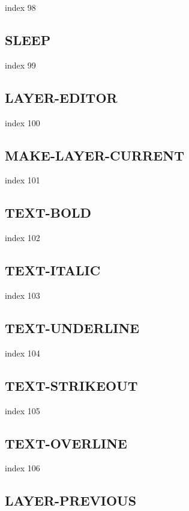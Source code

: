 \documentclass[a4paper]{report}
\begin{document}
 index 98

\subsection{SLEEP}

index 99

\subsection{LAYER-EDITOR}

index 100

\subsection{MAKE-LAYER-CURRENT}

index 101

\subsection{TEXT-BOLD}

index 102

\subsection{TEXT-ITALIC}

index 103

\subsection{TEXT-UNDERLINE}

index 104

\subsection{TEXT-STRIKEOUT}

index 105

\subsection{TEXT-OVERLINE}

index 106

\subsection{LAYER-PREVIOUS}
\end{document}
